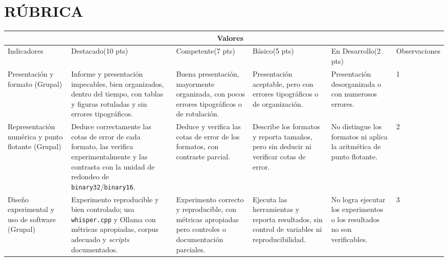 \documentclass[12pt]{article}
\begin{document}
\section*{RÚBRICA}
\begingroup
\scriptsize
\setlength{\LTpre}{0pt}\setlength{\LTpost}{0pt}
\begin{longtable}{|p{}|p{}|p{}|p{}|p{}|p{}|}
  \cline{2-5}
  \multicolumn{1}{p{0.15\textwidth}}{}&\multicolumn{4}{|c|}{Valores}&\multicolumn{1}{p{0.13\textwidth}}{}\\\hline
  Indicadores&\centering Destacado\newline (10 pts)&\centering Competente\newline (7 pts)&\centering Básico\newline (5 pts)&\centering En Desarrollo\newline (2 pts)&Observaciones\\\hline
  \endhead

Presentación y formato (Grupal) &Informe y presentación impecables, bien organizados, dentro del tiempo, con tablas y figuras rotuladas y sin errores tipográficos.&Buena presentación, mayormente organizada, con pocos errores tipográficos o de rotulación.&Presentación aceptable, pero con errores tipográficos o de organización.&Presentación desorganizada o con numerosos errores.&1 \vspace{0.15cm}~\\\hline

Representación numérica y punto flotante (Grupal) &Deduce correctamente las cotas de error de cada formato, las verifica experimentalmente y las contrasta con la unidad de redondeo de \texttt{binary32}/\texttt{binary16}.&Deduce y verifica las cotas de error de los formatos, con contraste parcial.&Describe los formatos y reporta tamaños, pero sin deducir ni verificar cotas de error.&No distingue los formatos ni aplica la aritmética de punto flotante.&2 \vspace{0.15cm}~\\\hline

Diseño experimental y uso de software (Grupal)&Experimento reproducible y bien controlado; usa \texttt{whisper.cpp} y Ollama con métricas apropiadas, corpus adecuado y \textit{scripts} documentados.&Experimento correcto y reproducible, con métricas apropiadas pero controles o documentación parciales.&Ejecuta las herramientas y reporta resultados, sin control de variables ni reproducibilidad.&No logra ejecutar los experimentos o los resultados no son verificables.&3 \vspace{0.15cm}~\\\hline


\end{longtable}
\end{document}

